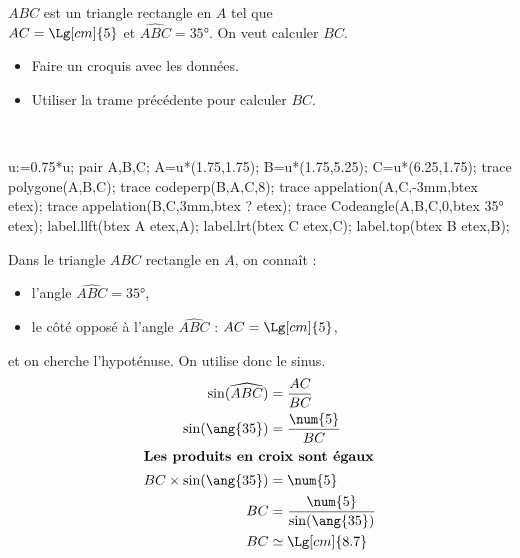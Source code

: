 \begin{exercice*}
    $ABC$ est un triangle rectangle en $A$ tel que\\ $AC=\Lg[cm]{5}$ et $\widehat{ABC}=\ang{35}$. On veut calculer $BC$.
    \begin{itemize}
        \item Faire un croquis avec les données.
        \item Utiliser la trame précédente pour calculer $BC$.
    \end{itemize}
\end{exercice*}
\begin{corrige}
    \phantom{rrr}\\
    \begin{center}
        \begin{Geometrie}[CoinHD={(5u,4.5u)}]
            u:=0.75*u;            
            pair A,B,C;
            A=u*(1.75,1.75);
            B=u*(1.75,5.25);
            C=u*(6.25,1.75);
            trace polygone(A,B,C);            
            trace codeperp(B,A,C,8);
            trace appelation(A,C,-3mm,btex  etex);            
            trace appelation(B,C,3mm,btex ? etex);
            trace Codeangle(A,B,C,0,btex \ang{35} etex);
            label.llft(btex A etex,A);
            label.lrt(btex C etex,C);
            label.top(btex B etex,B);
        \end{Geometrie}
    \end{center}
    {\red     
    Dans le triangle $ABC$ rectangle en $A$, on connaît :
    \begin{itemize}        
        \item l'angle $\widehat{ABC}=\ang{35}$,
        \item le côté opposé à l'angle $\widehat{ABC}$ : $AC=\Lg[cm]{5}$,
    \end{itemize}
    et on cherche l'hypoténuse. On utilise donc le sinus.
    \begin{align*}
        \sin(\widehat{ABC})&=\frac{AC}{BC}\\        
        \sin(\ang{35})&=\frac{\num{5}}{BC}\\        
        \intertext{\centering\bf Les produits en croix sont égaux}
        BC\times\sin(\ang{35})&=\num{5}\\
        BC&=\frac{\num{5}}{\sin(\ang{35})}\\
        BC&\simeq \Lg[cm]{8.7}
    \end{align*}
    }
\end{corrige}

